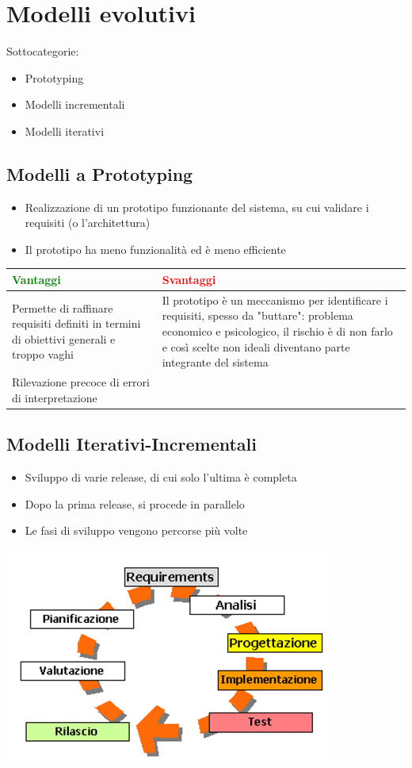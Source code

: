 \documentclass[12pt, a4paper]{report}
\begin{document}
\section{Modelli evolutivi}
Sottocategorie:
\begin{itemize}
    \item Prototyping
    \item Modelli incrementali
    \item Modelli iterativi
\end{itemize}
\subsection{Modelli a Prototyping}
\begin{itemize}
    \item Realizzazione di un prototipo funzionante del sistema, su cui validare i requisiti (o l'architettura)
    \item Il prototipo ha meno funzionalità ed è meno efficiente
\end{itemize}
\begin{center}
    \begin{tabular}{|p{}|p{}|}
        \hline
        \textbf{\textcolor{green}{Vantaggi}} & \textbf{\textcolor{red}{Svantaggi}} \\
        \hline
        Permette di raffinare requisiti definiti in termini di obiettivi generali e troppo vaghi & Il prototipo è un meccanismo per identificare i requisiti, spesso da "buttare": problema economico e psicologico, il rischio è di non farlo e così scelte non ideali diventano parte integrante del sistema \\
        \hline
        Rilevazione precoce di errori di interpretazione & \\
        \hline
    \end{tabular}
\end{center}
\subsection{Modelli Iterativi-Incrementali}
\begin{itemize}
    \item Sviluppo di varie release,  di cui solo l'ultima è completa
    \item Dopo la prima release, si procede in parallelo
    \item Le fasi di sviluppo vengono percorse più volte
\end{itemize}
\begin{center}
    \includegraphics[width=0.5\linewidth]{Immagini/iterativoincrementale.png}
\end{center}
\end{document}
